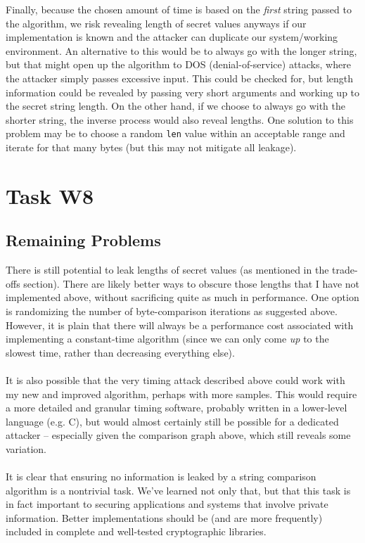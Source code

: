 \documentclass{article}
\providecommand{\inlinecode}{\texttt}
\begin{document}
Finally, because the chosen amount of time is based on the \textit{first} string passed to the algorithm, we risk revealing length of secret values anyways if our implementation is known and the attacker can duplicate our system/working environment.
An alternative to this would be to always go with the longer string, but that might open up the algorithm to DOS (denial-of-service) attacks, where the attacker simply passes excessive input. This could be checked for, but length information could be revealed by passing very short arguments and working up to the secret string length. On the other hand, if we choose to always go with the shorter string, the inverse process would also reveal lengths.
One solution to this problem may be to choose a random \inlinecode{len} value within an acceptable range and iterate for that many bytes (but this may not mitigate all leakage). \\

\section{Task W8}
\subsection{Remaining Problems}
There is still potential to leak lengths of secret values (as mentioned in the trade-offs section). There are likely better ways to obscure those lengths that I have not implemented above, without sacrificing quite as much in performance. One option is randomizing the number of byte-comparison iterations as suggested above. However, it is plain that there will always be a performance cost associated with implementing a constant-time algorithm (since we can only come \textit{up} to the slowest time, rather than decreasing everything else).\\
 \\
It is also possible that the very timing attack described above could work with my new and improved algorithm, perhaps with more samples. This would require a more detailed and granular timing software, probably written in a lower-level language (e.g. C), but would almost certainly still be possible for a dedicated attacker -- especially given the comparison graph above, which still reveals some variation.\\
 \\
It is clear that ensuring no information is leaked by a string comparison algorithm is a nontrivial task. We've learned not only that, but that this task is in fact important to securing applications and systems that involve private information. Better implementations should be (and are more frequently) included in complete and well-tested cryptographic libraries.

\bigskip
\bigskip
\bigskip
\bigskip

\printbibliography[heading=bibintoc]
\end{document}
